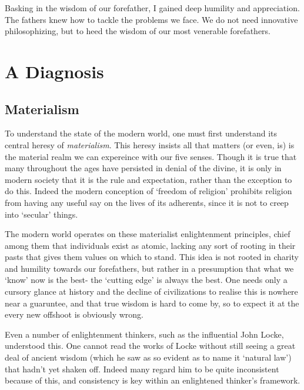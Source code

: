 \documentclass[letterpaper]{article}
\begin{document}
Basking in the wisdom of our forefather, I gained deep humility and appreciation. The fathers knew how to tackle the problems we face. We do not need innovative philosophizing, but to heed the wisdom of our most venerable forefathers.

\iffalse
I took upon the cross to learn and manifest this \textit{μέθεξις}. With my station as an engineer, and in a world dominated by technology, this seemed quite obviously to be initiated by studying what our relationship towards our technology ought to be.
\fi


\section{A Diagnosis}


\subsection{Materialism}

To understand the state of the modern world, one must first understand its central heresy of \textit{materialism}. This heresy insists all that matters (or even, is) is the material realm we can expereince with our five senses. Though it is true that many throughout the ages have persisted in denial of the divine, it is only in modern society that it is the rule and expectation, rather than the exception to do this. Indeed the modern conception of `freedom of religion' prohibits religion from having any useful say on the lives of its adherents, since it is not to creep into `secular' things.

The modern world operates on these materialist enlightenment principles, chief among them that individuals exist as atomic, lacking any sort of rooting in their pasts that gives them values on which to stand. This idea is not rooted in charity and humility towards our forefathers, but rather in a presumption that what we `know' now is the best- the `cutting edge' is always the best. One needs only a cursory glance at history and the decline of civilizations to realise this is nowhere near a guaruntee, and that true wisdom is hard to come by, so to expect it at the every new offshoot is obviously wrong.

Even a number of enlightenment thinkers, such as the influential John Locke, understood this. One cannot read the works of Locke without still seeing a great deal of ancient wisdom (which he saw as so evident as to name it `natural law') that hadn't yet shaken off. Indeed many regard him to be quite inconsistent because of this, and consistency is key within an enlightened thinker's framework.
\end{document}
